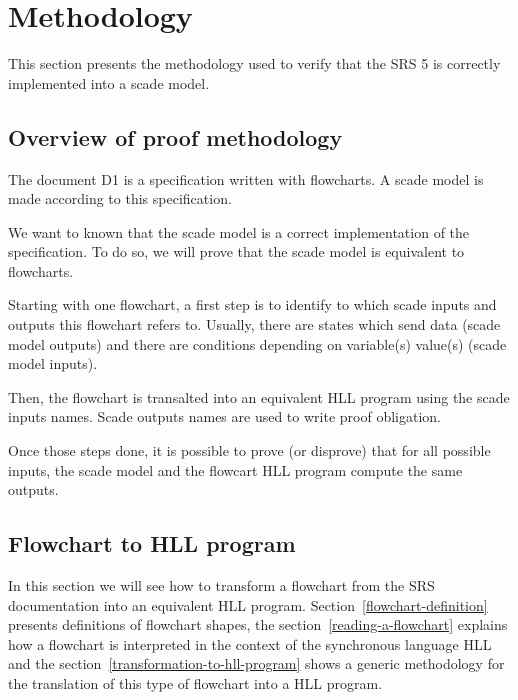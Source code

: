 \section{Methodology}
This section presents the methodology used to verify that the SRS 5 is
correctly implemented into a scade model.

\subsection{Overview of proof methodology}
\label{overview}
The document D1 is a specification written with flowcharts. A scade
model is made according to this specification.

We want to known that the scade model is a correct implementation of
the specification. To do so, we will prove that the scade model
is equivalent to flowcharts.


Starting with one flowchart, a first step is to identify to which
scade inputs and outputs this flowchart refers to. Usually, there are
states which send data (scade model outputs) and there are conditions
depending on variable(s) value(s) (scade model inputs).

Then, the flowchart is transalted into an equivalent HLL program using
the scade inputs names. Scade outputs names are used to write proof
obligation.

Once those steps done, it is possible to prove (or disprove) that for
all possible inputs, the scade model and the flowcart HLL program
compute the same outputs.


\subsection{Flowchart to HLL program}
\label{flowchart-2-hll}
In this section we will see how to transform a flowchart from the SRS
documentation into an equivalent HLL
program. Section~\ref{flowchart-definition} presents definitions of
flowchart shapes, the section~\ref{reading-a-flowchart} explains how a
flowchart is interpreted in the context of the synchronous language
HLL and the section~\ref{transformation-to-hll-program} shows a
generic methodology for the translation of this type of flowchart into
a HLL program.
